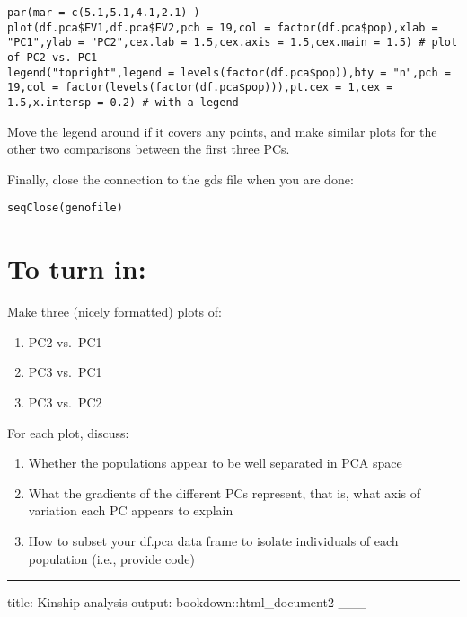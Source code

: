 \documentclass[
]{book}
\providecommand{\tightlist}{%
  \setlength{\itemsep}{0pt}\setlength{\parskip}{0pt}}
\begin{document}
\begin{verbatim}
par(mar = c(5.1,5.1,4.1,2.1) ) 
plot(df.pca$EV1,df.pca$EV2,pch = 19,col = factor(df.pca$pop),xlab = "PC1",ylab = "PC2",cex.lab = 1.5,cex.axis = 1.5,cex.main = 1.5) # plot of PC2 vs. PC1
legend("topright",legend = levels(factor(df.pca$pop)),bty = "n",pch = 19,col = factor(levels(factor(df.pca$pop))),pt.cex = 1,cex = 1.5,x.intersp = 0.2) # with a legend
\end{verbatim}

Move the legend around if it covers any points, and make similar plots for the other two comparisons between the first three PCs.

Finally, close the connection to the gds file when you are done:

\begin{verbatim}
seqClose(genofile)
\end{verbatim}

\hypertarget{to-turn-in}{%
\section{To turn in:}\label{to-turn-in}}

Make three (nicely formatted) plots of:

\begin{enumerate}
\def\labelenumi{\arabic{enumi}.}
\tightlist
\item
  PC2 vs.~PC1
\item
  PC3 vs.~PC1
\item
  PC3 vs.~PC2
\end{enumerate}

For each plot, discuss:

\begin{enumerate}
\def\labelenumi{\arabic{enumi}.}
\tightlist
\item
  Whether the populations appear to be well separated in PCA space
\item
  What the gradients of the different PCs represent, that is, what axis of variation each PC appears to explain
\item
  How to subset your df.pca data frame to isolate individuals of each population (i.e., provide code)
\end{enumerate}

\begin{center}\rule{0.5\linewidth}{0.5pt}\end{center}

title: Kinship analysis
output: bookdown::html\_document2
\_\_\_
\end{document}
